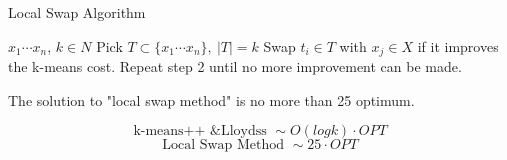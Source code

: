 \begin{algorithm}[H]
  \caption{Local Swap Algorithm}
  \label{ladder-mechanism}
  \begin{algorithmic}[1]
    \renewcommand\algorithmicrequire{\textbf{input}} 
    \REQUIRE ${x_1\cdots x_n}$, $k\in N$   
    \STATE Pick $T\subset \{x_1\cdots x_n\},\ |T|=k$ 
    \STATE Swap $t_i\in T$ with $x_j\in X$ if it improves the k-means cost.
    \STATE Repeat step 2 until no more improvement can be made.
  \end{algorithmic}
\end{algorithm}
\begin{lemma}[w/o proof]
  The solution to "local swap method" is no more than 25 optimum.
\end{lemma}
$$\text{k-means++ \& Lloydss }\sim O(logk)\cdot OPT$$
$$\text{Local Swap Method }\sim 25\cdot OPT$$
	
